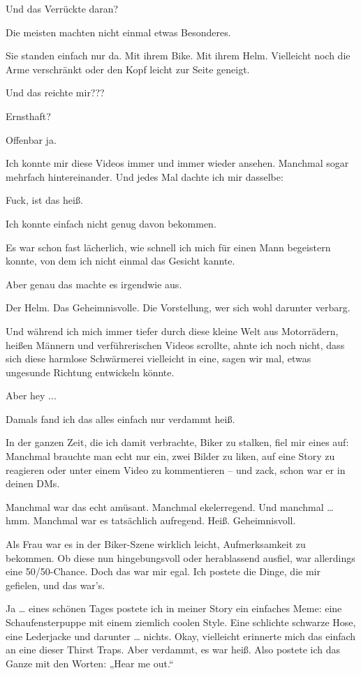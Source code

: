Und das Verrückte daran?

Die meisten machten nicht einmal etwas Besonderes.

Sie standen einfach nur da.
Mit ihrem Bike.
Mit ihrem Helm.
Vielleicht noch die Arme verschränkt oder den Kopf leicht zur Seite geneigt.

Und das reichte mir???

Ernsthaft?

Offenbar ja.

Ich konnte mir diese Videos immer und immer wieder ansehen. Manchmal sogar mehrfach hintereinander. Und jedes Mal dachte ich mir dasselbe:

Fuck, ist das heiß.

Ich konnte einfach nicht genug davon bekommen.

Es war schon fast lächerlich, wie schnell ich mich für einen Mann begeistern konnte, von dem ich nicht einmal das Gesicht kannte.

Aber genau das machte es irgendwie aus.

Der Helm. Das Geheimnisvolle. Die Vorstellung, wer sich wohl darunter verbarg.

Und während ich mich immer tiefer durch diese kleine Welt aus Motorrädern, heißen Männern und verführerischen Videos scrollte, ahnte ich noch nicht, dass sich diese harmlose Schwärmerei vielleicht in eine, sagen wir mal, etwas ungesunde Richtung entwickeln könnte.

Aber hey ...

Damals fand ich das alles einfach nur verdammt heiß.


In der ganzen Zeit, die ich damit verbrachte, Biker zu stalken, fiel mir eines auf: Manchmal brauchte man echt nur ein, zwei Bilder zu liken, auf eine Story zu reagieren oder unter einem Video zu kommentieren – und zack, schon war er in deinen DMs.

Manchmal war das echt amüsant. Manchmal ekelerregend. Und manchmal … hmm. Manchmal war es tatsächlich aufregend. Heiß. Geheimnisvoll.

Als Frau war es in der Biker-Szene wirklich leicht, Aufmerksamkeit zu bekommen. Ob diese nun hingebungsvoll oder herablassend ausfiel, war allerdings eine 50/50-Chance. Doch das war mir egal. Ich postete die Dinge, die mir gefielen, und das war’s.

Ja … eines schönen Tages postete ich in meiner Story ein einfaches Meme: eine Schaufensterpuppe mit einem ziemlich coolen Style. Eine schlichte schwarze Hose, eine Lederjacke und darunter … nichts. Okay, vielleicht erinnerte mich das einfach an eine dieser Thirst Traps. Aber verdammt, es war heiß. Also postete ich das Ganze mit den Worten: „Hear me out.“

